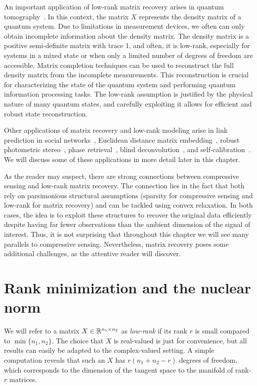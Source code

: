 An important application of low-rank matrix recovery arises in quantum tomography~\cite{gross2010quantum}.  In this context, the matrix $X$ represents the density matrix
of a quantum system.  Due to limitations in measurement devices, we often can only obtain incomplete information about
the density matrix.  The density matrix is a positive semi-definite matrix with trace 1, and often, it is low-rank,
especially for systems in a mixed state or when only a limited number of degrees of freedom are accessible.  Matrix
completion techniques can be used to reconstruct the full density matrix from the incomplete measurements. This
reconstruction is crucial for characterizing the state of the quantum system and performing quantum information
processing tasks. The low-rank assumption is justified by the physical nature of many quantum states, and
carefully exploiting it  allows for efficient and robust state reconstruction.  

Other applications of matrix recovery and low-rank modeling arise in link prediction in social networks~\cite{chiang2014prediction,menon2011link}, Euclidean distance matrix embedding~\cite{javanmard2013localization,dokmanic2015euclidean},  robust photometric stereo~\cite{WrightMa}, 
 phase retrieval~\cite{CESV2013}, blind deconvolution~\cite{ahmed2013blind}, and self-calibration~\cite{LS15}. We will discuss some of these applications in more detail later in this chapter.

As the reader may suspect, there are strong connections between compressive sensing and low-rank matrix recovery.
The connection lies in the fact that both rely on parsimonious structural assumptions (sparsity for compressive sensing and low-rank for matrix recovery) and can be tackled using convex relaxation. In both cases, the idea is to exploit these structures to recover the original data efficiently despite having far fewer observations than the ambient dimension of the signal of interest. Thus, it is not surprising that throughout this chapter we will see many parallels to compressive sensing. Nevertheless, matrix recovery poses some additional challenges, as the attentive reader will discover.

\section{Rank minimization and the nuclear norm}

We will refer to a matrix $X \in \mathbb{R}^{n_1 \times n_2}$ as {\em low-rank} if its rank $r$ is small compared to $\min\{n_1, n_2\}$. The choice that $X$ is real-valued is just for convenience, but all results can easily be adapted to the complex-valued setting.
A simple computation reveals that such an $X$ has $r(n_1+n_2-r)$ degrees of freedom, which corresponds to the 
dimension of the tangent space to the manifold of rank-$r$ matrices.


